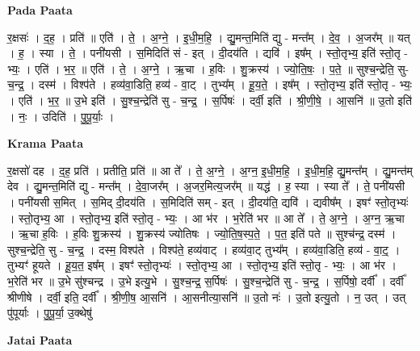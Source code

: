 \documentclass[17pt]{extarticle}
\begin{document}
\textbf{Pada Paata} \newline

र॒क्षसः॑ । द॒ह॒ । प्रति॑ ॥ एति॑ । ते॒ । अ॒ग्ने॒ । इ॒धी॒म॒हि॒ । द्यु॒मन्त॒मिति॑ द्यु - मन्त᳚म् । दे॒व॒ । अ॒जर᳚म् ॥ यत् । ह॒ । स्या । ते॒ । पनी॑यसी । स॒मिदिति॑ सं - इत् । दी॒दय॑ति । द्यवि॑ । इष᳚म् । स्तो॒तृभ्य॒ इति॑ स्तो॒तृ - भ्यः॒ । एति॑ । भ॒र॒ ॥ एति॑ । ते॒ । अ॒ग्ने॒ । ऋ॒चा । ह॒विः । शु॒क्रस्य॑ । ज्यो॒ति॒षः॒ । प॒ते॒ ॥ सुश्च॒न्द्रेति॒ सु-च॒न्द्र॒ । दस्म॑ । विश्प॑ते । हव्य॑वा॒डिति॒ हव्य॑ - वा॒ट् । तुभ्य᳚म् । हू॒य॒ते॒ । इष᳚म् । स्तो॒तृभ्य॒ इति॑ स्तो॒तृ - भ्यः॒ । एति॑ । भ॒र॒ ॥ उ॒भे इति॑ । सु॒श्च॒न्द्रेति॑ सु - च॒न्द्र॒ । स॒र्पिषः॑ । दर्वी॒ इति॑ । श्री॒णी॒षे॒ । आ॒सनि॑ ॥ उ॒तो इति॑ । नः॒ । उदिति॑ । पु॒पू॒र्याः॒ ।  \newline


\textbf{Krama Paata} \newline

र॒क्षसो॑ दह । द॒ह॒ प्रति॑ । प्रतीति॒ प्रति॑ ॥ आ ते᳚ । ते॒ अ॒ग्ने॒ । अ॒ग्न॒ इ॒धी॒म॒हि॒ । इ॒धी॒म॒हि॒ द्यु॒मन्त᳚म् । द्यु॒मन्त॑म् देव । द्यु॒मन्त॒मिति॑ द्यु - मन्त᳚म् । दे॒वा॒जर᳚म् । अ॒जर॒मित्य॒जर᳚म् ॥ यद्ध॑ । ह॒ स्या । स्या ते᳚ । ते॒ पनी॑यसी । पनी॑यसी स॒मित् । स॒मिद् दी॒दय॑ति । स॒मिदिति॑ सम् - इत् । दी॒दय॑ति॒ द्यवि॑ । द्यवीष᳚म् । इषꣳ॑ स्तो॒तृभ्यः॑ । स्तो॒तृभ्य॒ आ । स्तो॒तृभ्य॒ इति॑ स्तो॒तृ - भ्यः॒ । आ भ॑र । भ॒रेति॑ भर ॥ आ ते᳚ । ते॒ अ॒ग्ने॒ । अ॒ग्न॒ ऋ॒चा । ऋ॒चा ह॒विः । ह॒विः शु॒क्रस्य॑ । शु॒क्रस्य॑ ज्योतिषः । ज्यो॒ति॒ष॒स्प॒ते॒ । प॒त॒ इति॑ पते ॥ सुश्च॑न्द्र॒ दस्म॑ । सुश्च॒न्द्रेति॒ सु - च॒न्द्र॒ । दस्म॒ विश्प॑ते । विश्प॑ते॒ हव्य॑वाट् । हव्य॑वा॒ट् तुभ्य᳚म् । हव्य॑वा॒डिति॒ हव्य॑ - वा॒ट्॒ । तुभ्यꣳ॑ हूयते । हू॒य॒त॒ इष᳚म् । इषꣳ॑ स्तो॒तृभ्यः॑ । स्तो॒तृभ्य॒ आ । स्तो॒तृभ्य॒ इति॑ स्तो॒तृ - भ्यः॒ । आ भ॑र । भ॒रेति॑ भर ॥ उ॒भे सु॑श्चन्द्र । उ॒भे इत्यु॒भे । सु॒श्च॒न्द्र॒ स॒र्पिषः॑ । सु॒श्च॒न्द्रेति॑ सु - च॒न्द्र॒ । स॒र्पिषो॒ दर्वी᳚ । दर्वी᳚ श्रीणीषे । दर्वी॒ इति॒ दर्वी᳚ । श्री॒णी॒ष॒ आ॒सनि॑ । आ॒सनीत्या॒सनि॑ ॥ उ॒तो नः॑ । उ॒तो इत्यु॒तो । न॒ उत् । उत् पु॑पूर्याः । पु॒पू॒र्या॒ उ॒क्थेषु॑ \newline

\textbf{Jatai Paata} \newline
\end{document}

